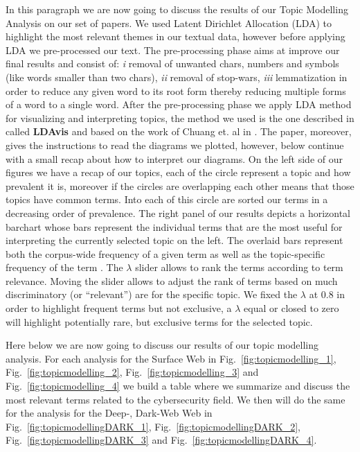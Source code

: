 In this paragraph we are now going to discuss the results of our Topic Modelling Analysis on our set of papers. We used Latent Dirichlet Allocation (LDA) to highlight the most relevant themes in our textual data, however before applying LDA we pre-processed our text. The pre-processing phase aims at improve our final results and consist of: \emph{i} removal of unwanted chars, numbers and symbols (like words smaller than two chars), \emph{ii} removal of stop-wars, \emph{iii} lemmatization in order to reduce any given word to its root form thereby reducing multiple forms of a word to a single word.
After the pre-processing phase we apply LDA method for visualizing and interpreting topics, the method we used is the one described in \cite{W14-3110} called \textbf{LDAvis} and based on the work of Chuang et. al in \cite{Chuang:2012:TVT:2254556.2254572}. The paper, moreover, gives the instructions to read the diagrams we plotted, however, below continue with a small recap about how to interpret our diagrams. 
On the left side of our figures we have a recap of our topics, each of the circle represent a topic and how prevalent it is, moreover if the circles are overlapping each other means that those topics have common terms. Into each of this circle are sorted our terms in a decreasing order of prevalence.
The right panel of our results depicts a horizontal barchart whose bars represent the individual terms that are the most useful for interpreting the currently selected topic on the left. The overlaid bars represent both the corpus-wide frequency of a given term as well as the topic-specific frequency of the term \cite{W14-3110, Chuang:2012:TVT:2254556.2254572}. The $\lambda$ slider allows to rank the terms according to term relevance. Moving the slider allows to adjust the rank of terms based on much discriminatory (or ``relevant'') are for the specific topic. We fixed the $\lambda$ at 0.8 in order to highlight frequent terms but not exclusive, a $\lambda$ equal or closed to zero will highlight potentially rare, but exclusive terms for the selected topic.

Here below we are now going to discuss our results of our topic modelling analysis. For each analysis for the Surface Web in Fig.~\ref{fig:topicmodelling_1}, Fig.~\ref{fig:topicmodelling_2}, Fig.~\ref{fig:topicmodelling_3} and Fig.~\ref{fig:topicmodelling_4} we build a table where we summarize and discuss the most relevant terms related to the cybersecurity field. We then will do the same for the analysis for the Deep-, Dark-Web Web in Fig.~\ref{fig:topicmodellingDARK_1}, Fig.~\ref{fig:topicmodellingDARK_2}, Fig.~\ref{fig:topicmodellingDARK_3} and Fig.~\ref{fig:topicmodellingDARK_4}.

